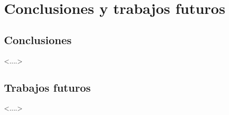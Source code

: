 \chapter{Conclusiones y trabajos futuros}


\section{Conclusiones}

<....>

\section{Trabajos futuros}

<....>
